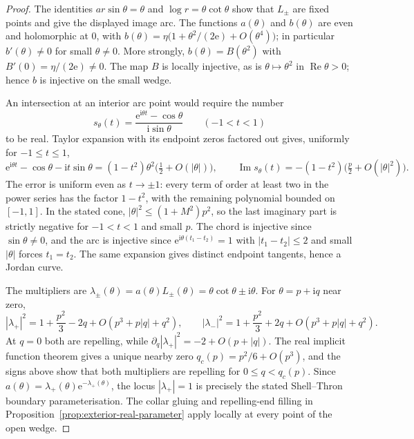 \documentclass[11pt]{amsart}
\theoremstyle{definition}
\newcommand{\eee}{\mathrm{e}}
\newcommand{\ii}{\mathrm{i}}
\begin{document}
\begin{proof}
The identities $a r\sin\theta=\theta$ and
$\log r=\theta\cot\theta$ show that $L_\pm$ are fixed points and
give the displayed image arc.  The functions $a(\theta)$ and
$b(\theta)$ are even and holomorphic at $0$, with
$b(\theta)=\eta\bigl(1+\theta^2/(2\eee)+O(\theta^4)\bigr)$;
in particular $b'(\theta)\ne0$ for small $\theta\ne0$.  More strongly,
$b(\theta)=B(\theta^2)$ with $B'(0)=\eta/(2\eee)\ne0$.
The map $B$ is locally injective, as is $\theta\mapsto\theta^2$ in
$\operatorname{Re}\theta>0$; hence $b$ is injective on the small wedge.

An intersection at an interior arc point would require the number
\[
 s_\theta(t)=
 \frac{\eee^{\ii\theta t}-\cos\theta}{\ii\sin\theta}
 \qquad(-1<t<1)
\]
to be real.  Taylor expansion with its endpoint zeros factored out
gives, uniformly for $-1\le t\le1$,
\[
 \eee^{\ii\theta t}-\cos\theta-\ii t\sin\theta
  =(1-t^2)\theta^2\bigl(\tfrac12+O(|\theta|)\bigr),
 \qquad
 \operatorname{Im}s_\theta(t)
  =-(1-t^2)\bigl(\tfrac p2+O(|\theta|^2)\bigr).
\]
The error is uniform even as $t\to\pm1$: every term of order at
least two in the power series has the factor $1-t^2$, with the
remaining polynomial bounded on $[-1,1]$.  In the stated cone,
$|\theta|^2\le(1+M^2)p^2$, so the last imaginary part is strictly
negative for $-1<t<1$ and small $p$.  The chord is injective since
$\sin\theta\ne0$, and the arc is injective since
$\eee^{\ii\theta(t_1-t_2)}=1$ with $|t_1-t_2|\le2$ and small
$|\theta|$ forces $t_1=t_2$.  The same expansion gives distinct
endpoint tangents, hence a Jordan curve.

The multipliers are
$\lambda_\pm(\theta)=a(\theta)L_\pm(\theta)
 =\theta\cot\theta\pm\ii\theta$.  For $\theta=p+\ii q$ near zero,
\[
 |\lambda_+|^2=1+\frac{p^2}{3}-2q
       +O(p^3+p|q|+q^2),\qquad
 |\lambda_-|^2=1+\frac{p^2}{3}+2q
       +O(p^3+p|q|+q^2).
\]
At $q=0$ both are repelling, while
$\partial_q|\lambda_+|^2=-2+O(p+|q|)$.  The real implicit function
theorem gives a unique nearby zero $q_c(p)=p^2/6+O(p^3)$, and the
signs above show that both multipliers are repelling for
$0\le q<q_c(p)$.  Since
$a(\theta)=\lambda_+(\theta)\eee^{-\lambda_+(\theta)}$,
the locus $|\lambda_+|=1$ is precisely the stated
Shell--Thron boundary parameterisation.  The collar gluing and
repelling-end filling in Proposition~\ref{prop:exterior-real-parameter}
apply locally at every point of the open wedge.
\end{proof}
\end{document}
